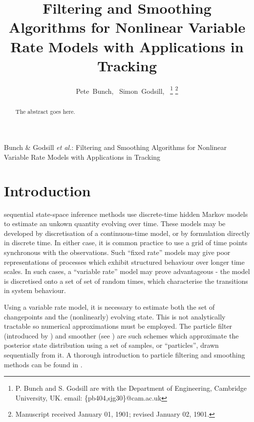 \documentclass[journal]{IEEEtran}
\begin{document}
\title{Filtering and Smoothing Algorithms for Nonlinear Variable Rate Models with Applications in Tracking}

\author{Pete~Bunch,~\IEEEmembership{}
        Simon~Godsill,~%
\thanks{P. Bunch and S. Godsill are with the Department
of Engineering, Cambridge University, UK. email: \{pb404,sjg30\}@cam.ac.uk}%
\thanks{Manuscript received January 01, 1901; revised January 02, 1901.}}

%
{Bunch \& Godsill \MakeLowercase{\textit{et al.}}: Filtering and Smoothing Algorithms for Nonlinear Variable Rate Models with Applications in Tracking}

\maketitle

\begin{abstract}
The abstract goes here.
\end{abstract}

\begin{IEEEkeywords}

\end{IEEEkeywords}



\section{Introduction}

 sequential state-space inference methods use discrete-time hidden Markov models to estimate an unkown quantity evolving over time. These models may be developed by discretisation of a continuous-time model, or by formulation directly in discrete time. In either case, it is common practice to use a grid of time points synchronous with the observations. Such ``fixed rate'' models may give poor representations of processes which exhibit structured behaviour over longer time scales. In such cases, a ``variable rate'' model may prove advantageous - the model is discretised onto a set of set of random times, which characterise the transitions in system behaviour.

Using a variable rate model, it is necessary to estimate both the set of changepoints and the (nonlinearly) evolving state. This is not analytically tractable so numerical approximations must be employed. The particle filter (introduced by \cite{Gordon1993}) and smoother (see \cite{Doucet2000a,Godsill2004}) are such schemes which approximate the posterior state distribution using a set of samples, or ``particles'', drawn sequentially from it.  A thorough introduction to particle filtering and smoothing methods can be found in \cite{Cappe2007,Doucet2009}.
\end{document}
